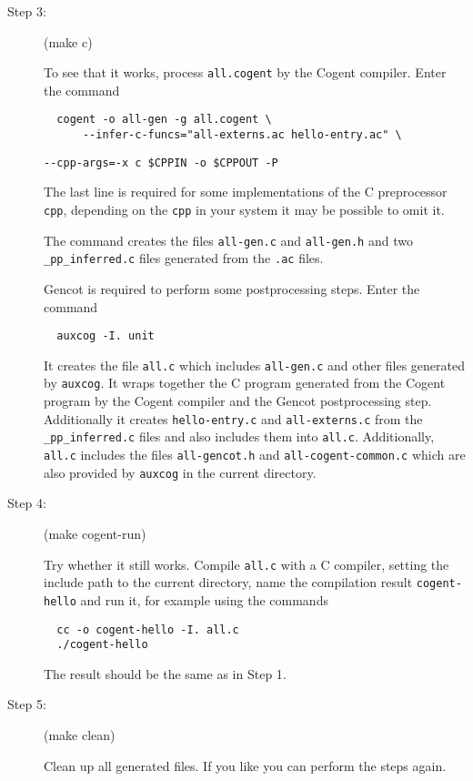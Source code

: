 \documentclass[a4paper]{report}
\newcommand{\code}[1]{\textnormal{\texttt{#1}}}
\begin{document}
\begin{description}
\item[Step 3:] (make c)

To see that it works, process \code{all.cogent} by the Cogent compiler. Enter the command
\begin{verbatim}
  cogent -o all-gen -g all.cogent \
      --infer-c-funcs="all-externs.ac hello-entry.ac" \
\end{verbatim}
\vspace*{-4mm}\hspace*{11mm}\code{-{}-cpp-args=\textquotesingle -x c \$CPPIN -o \$CPPOUT -P\textquotesingle}

\vspace*{4mm}\noindent
The last line is required for some implementations of the C preprocessor \code{cpp}, depending on the \code{cpp} in your
system it may be possible to omit it.

The command creates the files \code{all-gen.c} and \code{all-gen.h} and two \code{\_pp\_inferred.c} files generated from
the \code{.ac} files. 

Gencot is required to perform some postprocessing steps. Enter the command
\begin{verbatim}
  auxcog -I. unit
\end{verbatim}
It creates the file \code{all.c} which includes \code{all-gen.c} and other files generated by \code{auxcog}. It wraps together
the C program generated from the Cogent program by the Cogent compiler and the Gencot postprocessing step. Additionally
it creates \code{hello-entry.c} and \code{all-externs.c} from the \code{\_pp\_inferred.c} files and also includes them
into \code{all.c}. Additionally, \code{all.c} includes the files \code{all-gencot.h} and \code{all-cogent-common.c} which
are also provided by \code{auxcog} in the current directory.

\item[Step 4:] (make cogent-run)

Try whether it still works. Compile \code{all.c} with a C compiler, setting the include path to the current directory,
name the compilation result \code{cogent-hello} and run it, for example using the commands
\begin{verbatim}
  cc -o cogent-hello -I. all.c
  ./cogent-hello
\end{verbatim}
The result should be the same as in Step 1.

\item[Step 5:] (make clean)

Clean up all generated files. If you like you can perform the steps again.
\end{description}
\end{document}
